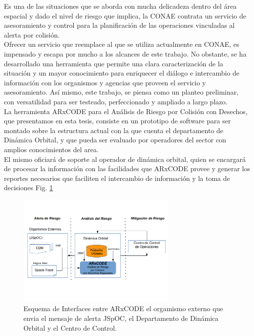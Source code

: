 Es una de las situaciones que se aborda con mucha delicadeza dentro del \'area espacial y dado el nivel de riesgo que implica, la CONAE contrata un servicio de asesoramiento y control para la planificaci\'on de las operaciones vinculadas al alerta por colisi\'on.\\

Ofrecer un servicio que reemplace al que se utiliza actualmente en CONAE, es impensado y escapa por mucho a los alcances de este trabajo. No obstante, se ha desarrollado una herramienta que permite una clara caracterizaci\'on de la situaci\'on y un mayor conocimiento para enriquecer el di\'alogo e intercambio de informaci\'on con los organismos y agencias que proveen el servicio y asesoramiento. As\'i mismo, este trabajo,  se piensa como un planteo preliminar, con versatilidad para ser testeado, perfeccionado y ampliado a largo plazo.\\

La herramienta ARxCODE para el An\'alisis de Riesgo por Colisi\'on con Desechos, que presentamos en esta tesis, consiste en un prototipo de software para ser montado sobre la estructura actual con la que cuenta el departamento de Din\'amica Orbital, y que pueda ser evaluado por operadores del sector con amplios conocimientos del area.\\

El mismo oficiar\'a de soporte al operador de din\'amica orbital, quien se encargar\'a de procesar la informaci\'on con las facilidades que ARxCODE provee y generar los reportes necesarios que faciliten el intercambio de informaci\'on y la toma de decisiones Fig. \ref{fig:arcodeInterface} \\ 


\begin{figure}[!h]
\centering
  \includegraphics[width=0.7\textwidth]{imagenes/interfasessistemas}
  \caption[Interfaces del ARxCODE]{Esquema de Interfaces entre ARxCODE el orgamismo externo que envia el mensaje de alerta JSpOC, el Departamento de Din\'amica Orbital y el Centro de Control.}
  \label{fig:arcodeInterface}
\end{figure}



